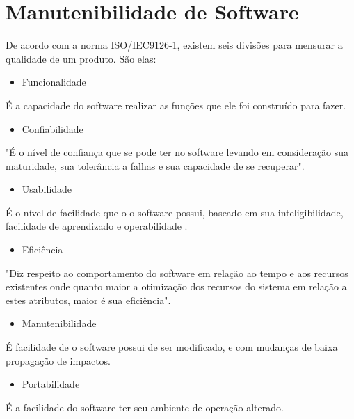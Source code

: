 \section{Manutenibilidade de Software}\label{manutenibilidade}
De acordo com a norma ISO/IEC9126-1, existem seis divisões para mensurar a qualidade de um produto. São elas:

\begin{itemize}
\item Funcionalidade
\end{itemize} 
É a capacidade do software realizar as funções que ele foi construído para fazer.
\begin{itemize}
\item Confiabilidade
\end{itemize}
"É o nível de confiança que se pode ter no software 
levando  em  consideração  sua  maturidade,  sua  tolerância  a  falhas  e  sua 
capacidade de se recuperar"\space \cite[p.~28]{isaias2012}. 
\begin{itemize}
\item Usabilidade
\end{itemize}
É o nível de facilidade que o o software possui, baseado em sua inteligibilidade, facilidade de aprendizado e operabilidade \cite{isaias2012}.
\begin{itemize}
\item Eficiência
\end{itemize}
"Diz respeito ao comportamento do software em relação ao tempo e aos recursos existentes onde quanto maior a otimização dos recursos do sistema em relação a estes atributos, maior é sua eficiência"\space\cite[p.~28]{isaias2012}.
\begin{itemize}
\item Manutenibilidade
\end{itemize}
É facilidade de o software possui de ser modificado, e com mudanças de baixa propagação de impactos.
\begin{itemize}
\item Portabilidade
\end{itemize}
É a facilidade do software ter seu ambiente de operação alterado.

